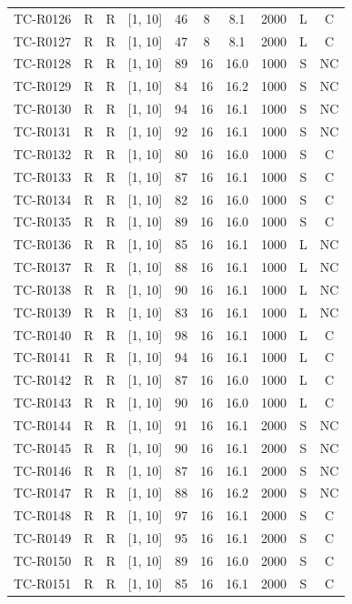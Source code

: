 \begin{longtable}{lccccccccc}
TC-R0126 & R & R & [1, 10] & 46 & 8 & 8.1 & 2000 & L & C \\
TC-R0127 & R & R & [1, 10] & 47 & 8 & 8.1 & 2000 & L & C \\
TC-R0128 & R & R & [1, 10] & 89 & 16 & 16.0 & 1000 & S & NC \\
TC-R0129 & R & R & [1, 10] & 84 & 16 & 16.2 & 1000 & S & NC \\
TC-R0130 & R & R & [1, 10] & 94 & 16 & 16.1 & 1000 & S & NC \\
TC-R0131 & R & R & [1, 10] & 92 & 16 & 16.1 & 1000 & S & NC \\
TC-R0132 & R & R & [1, 10] & 80 & 16 & 16.0 & 1000 & S & C \\
TC-R0133 & R & R & [1, 10] & 87 & 16 & 16.1 & 1000 & S & C \\
TC-R0134 & R & R & [1, 10] & 82 & 16 & 16.0 & 1000 & S & C \\
TC-R0135 & R & R & [1, 10] & 89 & 16 & 16.0 & 1000 & S & C \\
TC-R0136 & R & R & [1, 10] & 85 & 16 & 16.1 & 1000 & L & NC \\
TC-R0137 & R & R & [1, 10] & 88 & 16 & 16.1 & 1000 & L & NC \\
TC-R0138 & R & R & [1, 10] & 90 & 16 & 16.1 & 1000 & L & NC \\
TC-R0139 & R & R & [1, 10] & 83 & 16 & 16.1 & 1000 & L & NC \\
TC-R0140 & R & R & [1, 10] & 98 & 16 & 16.1 & 1000 & L & C \\
TC-R0141 & R & R & [1, 10] & 94 & 16 & 16.1 & 1000 & L & C \\
TC-R0142 & R & R & [1, 10] & 87 & 16 & 16.0 & 1000 & L & C \\
TC-R0143 & R & R & [1, 10] & 90 & 16 & 16.0 & 1000 & L & C \\
TC-R0144 & R & R & [1, 10] & 91 & 16 & 16.1 & 2000 & S & NC \\
TC-R0145 & R & R & [1, 10] & 90 & 16 & 16.1 & 2000 & S & NC \\
TC-R0146 & R & R & [1, 10] & 87 & 16 & 16.1 & 2000 & S & NC \\
TC-R0147 & R & R & [1, 10] & 88 & 16 & 16.2 & 2000 & S & NC \\
TC-R0148 & R & R & [1, 10] & 97 & 16 & 16.1 & 2000 & S & C \\
TC-R0149 & R & R & [1, 10] & 95 & 16 & 16.1 & 2000 & S & C \\
TC-R0150 & R & R & [1, 10] & 89 & 16 & 16.0 & 2000 & S & C \\
TC-R0151 & R & R & [1, 10] & 85 & 16 & 16.1 & 2000 & S & C \\

\end{longtable}
